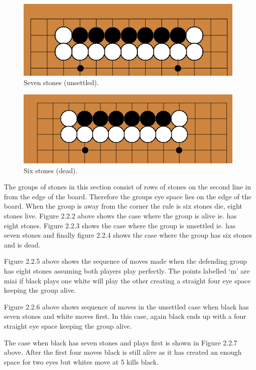\documentclass{l3proj}
\begin{document}
\begin{figure}[H]
\centering
\includegraphics[scale=0.5]{Images/sevenunsettled.png}
\caption{Seven stones (unsettled).}
\end{figure}

\begin{figure}[H]
\centering
\includegraphics[scale=0.5]{Images/sixdie.png}
\caption{Six stones (dead).}
\end{figure}

The groups of stones in this section consist of rows of stones on the second line in from the edge of the board.  Therefore the groups eye space lies on the edge of the board. When the group is away from the corner the rule is six stones die, eight stones live. Figure 2.2.2 above shows the case where the group is alive ie. has eight stones. Figure 2.2.3 shows the case where the group is unsettled ie. has seven stones and finally figure 2.2.4 shows the case where the group has six stones and is dead.

Figure 2.2.5 above shows the sequence of moves made when the defending group has eight stones assuming both players play perfectly. The points labelled ‘m’ are miai if black plays one white will play the other creating a straight four eye space keeping the group alive.

Figure 2.2.6 above shows sequence of moves in the unsettled case when black has seven stones and white moves first.  In this case, again black ends up with a four straight eye space keeping the group alive.

The case when black has seven stones and plays first is shown in Figure 2.2.7 above. After the first four moves black is still alive as it has created an enough space for two eyes but whites move at 5 kills black.
\end{document}
